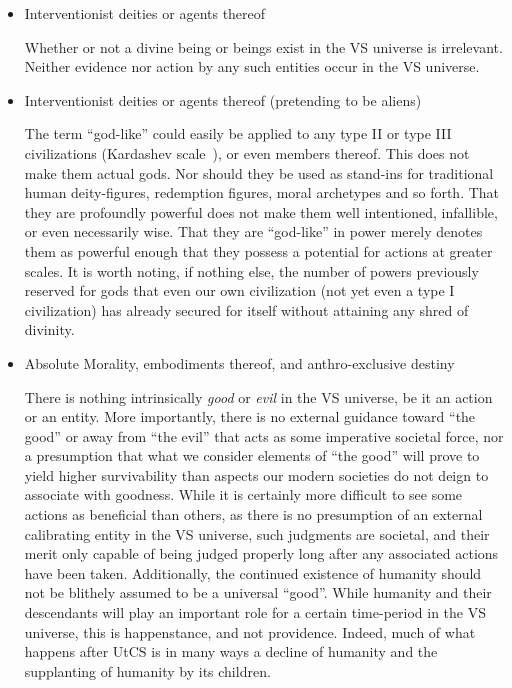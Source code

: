\begin{itemize}

\item Interventionist deities or agents thereof

Whether or not a divine being or beings exist in the VS universe is
irrelevant. Neither evidence nor action by any such entities occur in
the VS universe.

\item Interventionist deities or agents thereof (pretending to be aliens)

The term ``god-like'' could easily be applied to any type II or type
III civilizations (Kardashev scale~\cite{Kardashev}), or even members
thereof. This does not make them actual gods. Nor should they be used
as stand-ins for traditional human deity-figures, redemption figures,
moral archetypes and so forth. That they are profoundly powerful does
not make them well intentioned, infallible, or even necessarily
wise. That they are ``god-like'' in power merely denotes them as
powerful enough that they possess a potential for actions at greater
scales. It is worth noting, if nothing else, the number of powers
previously reserved for gods that even our own civilization (not yet
even a type I civilization) has already secured for itself without attaining
any shred of divinity.

\item Absolute Morality, embodiments thereof, and anthro-exclusive destiny

There is nothing intrinsically {\em good} or {\em evil} in the VS
universe, be it an action or an entity. More importantly, there is no
external guidance toward ``the good'' or away from ``the evil'' that
acts as some imperative societal force, nor a presumption that what we
consider elements of ``the good'' will prove to yield higher
survivability than aspects our modern societies do not deign to
associate with goodness. While it is certainly more difficult to see
some actions as beneficial than others, as there is no presumption of
an external calibrating entity in the VS universe, such judgments are
societal, and their merit only capable of being judged properly long
after any associated actions have been taken. Additionally, the
continued existence of humanity should not be blithely assumed to be a
universal ``good''. While humanity and their descendants will play an
important role for a certain time-period in the VS universe, this is
happenstance, and not providence. Indeed, much of what happens after
UtCS is in many ways a decline of humanity and the supplanting of
humanity by its children.


\end{itemize}

